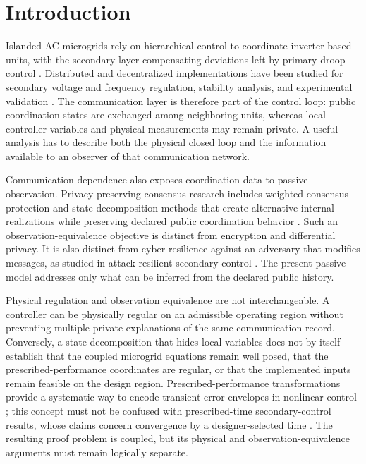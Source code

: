 \documentclass[journal]{IEEEtran}
\begin{document}
\section{Introduction}

Islanded AC microgrids rely on hierarchical control to coordinate inverter-based units, with the secondary layer compensating deviations left by primary droop control \cite{Guerrero2011,Bidram2012}. Distributed and decentralized implementations have been studied for secondary voltage and frequency regulation, stability analysis, and experimental validation \cite{Lantao2019,Xiaokang2023,Rosini2024,Bu2025}. The communication layer is therefore part of the control loop: public coordination states are exchanged among neighboring units, whereas local controller variables and physical measurements may remain private. A useful analysis has to describe both the physical closed loop and the information available to an observer of that communication network.

Communication dependence also exposes coordination data to passive observation. Privacy-preserving consensus research includes weighted-consensus protection and state-decomposition methods that create alternative internal realizations while preserving declared public coordination behavior \cite{WangLiuLiHuang2021,SD,SD-MSR,YeCaoChowCai2024}. Such an observation-equivalence objective is distinct from encryption and differential privacy. It is also distinct from cyber-resilience against an adversary that modifies messages, as studied in attack-resilient secondary control \cite{Huang2026}. The present passive model addresses only what can be inferred from the declared public history.

Physical regulation and observation equivalence are not interchangeable. A controller can be physically regular on an admissible operating region without preventing multiple private explanations of the same communication record. Conversely, a state decomposition that hides local variables does not by itself establish that the coupled microgrid equations remain well posed, that the prescribed-performance coordinates are regular, or that the implemented inputs remain feasible on the design region. Prescribed-performance transformations provide a systematic way to encode transient-error envelopes in nonlinear control \cite{Bechlioulis2008}; this concept must not be confused with prescribed-time secondary-control results, whose claims concern convergence by a designer-selected time \cite{Bu2025}. The resulting proof problem is coupled, but its physical and observation-equivalence arguments must remain logically separate.
\end{document}
